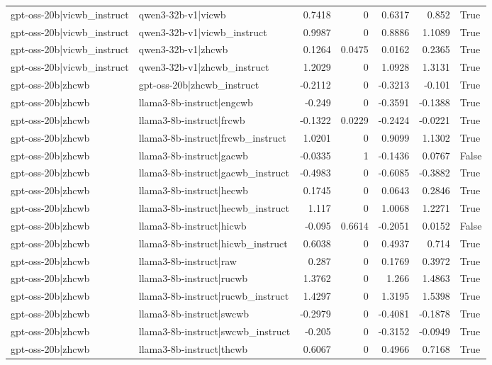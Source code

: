 \begin{table}
\begin{tabular}{l l r r r r l}
gpt-oss-20b|vicwb_instruct & qwen3-32b-v1|vicwb & 0.7418 & 0 & 0.6317 & 0.852 & True \\
gpt-oss-20b|vicwb_instruct & qwen3-32b-v1|vicwb_instruct & 0.9987 & 0 & 0.8886 & 1.1089 & True \\
gpt-oss-20b|vicwb_instruct & qwen3-32b-v1|zhcwb & 0.1264 & 0.0475 & 0.0162 & 0.2365 & True \\
gpt-oss-20b|vicwb_instruct & qwen3-32b-v1|zhcwb_instruct & 1.2029 & 0 & 1.0928 & 1.3131 & True \\
gpt-oss-20b|zhcwb & gpt-oss-20b|zhcwb_instruct & -0.2112 & 0 & -0.3213 & -0.101 & True \\
gpt-oss-20b|zhcwb & llama3-8b-instruct|engcwb & -0.249 & 0 & -0.3591 & -0.1388 & True \\
gpt-oss-20b|zhcwb & llama3-8b-instruct|frcwb & -0.1322 & 0.0229 & -0.2424 & -0.0221 & True \\
gpt-oss-20b|zhcwb & llama3-8b-instruct|frcwb_instruct & 1.0201 & 0 & 0.9099 & 1.1302 & True \\
gpt-oss-20b|zhcwb & llama3-8b-instruct|gacwb & -0.0335 & 1 & -0.1436 & 0.0767 & False \\
gpt-oss-20b|zhcwb & llama3-8b-instruct|gacwb_instruct & -0.4983 & 0 & -0.6085 & -0.3882 & True \\
gpt-oss-20b|zhcwb & llama3-8b-instruct|hecwb & 0.1745 & 0 & 0.0643 & 0.2846 & True \\
gpt-oss-20b|zhcwb & llama3-8b-instruct|hecwb_instruct & 1.117 & 0 & 1.0068 & 1.2271 & True \\
gpt-oss-20b|zhcwb & llama3-8b-instruct|hicwb & -0.095 & 0.6614 & -0.2051 & 0.0152 & False \\
gpt-oss-20b|zhcwb & llama3-8b-instruct|hicwb_instruct & 0.6038 & 0 & 0.4937 & 0.714 & True \\
gpt-oss-20b|zhcwb & llama3-8b-instruct|raw & 0.287 & 0 & 0.1769 & 0.3972 & True \\
gpt-oss-20b|zhcwb & llama3-8b-instruct|rucwb & 1.3762 & 0 & 1.266 & 1.4863 & True \\
gpt-oss-20b|zhcwb & llama3-8b-instruct|rucwb_instruct & 1.4297 & 0 & 1.3195 & 1.5398 & True \\
gpt-oss-20b|zhcwb & llama3-8b-instruct|swcwb & -0.2979 & 0 & -0.4081 & -0.1878 & True \\
gpt-oss-20b|zhcwb & llama3-8b-instruct|swcwb_instruct & -0.205 & 0 & -0.3152 & -0.0949 & True \\
gpt-oss-20b|zhcwb & llama3-8b-instruct|thcwb & 0.6067 & 0 & 0.4966 & 0.7168 & True \\

\end{tabular}
\end{table}
